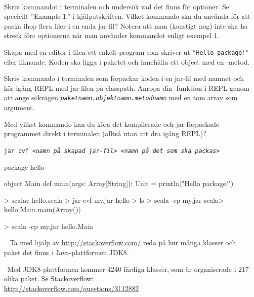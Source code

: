 
\QUESTBEGIN

\Task\Uberkurs  \what~

\Subtask Skriv kommandot  i terminalen och undersök vad det finns för optioner. Se speciellt ''Example 1.'' i hjälputskriften. Vilket kommando ska du använda för att packa ihop flera filer i en enda jar-fil? Notera att man (konstigt nog) inte ska ha streck före optionerna när man använder kommandot  enligt exempel 1.

\Subtask Skapa med en editor i filen  ett enkelt program som skriver ut \texttt{"Hello package!"} eller liknande. Koden ska ligga i paketet  och innehålla ett object  med en -metod.

\Subtask Skriv kommando i terminalen som förpackar koden i en jar-fil med namnet  och kör igång REPL med jar-filen på classpath. Anropa din -funktion i REPL genom att ange sökvägen \textit{\texttt{paketnamn.objektnamn.metodnamn}} med en tom array som argument.

\Subtask Med vilket kommando kan du köra det kompilerade och jar-förpackade programmet direkt i terminalen (alltså utan att dra igång REPL)?

\SOLUTION

\TaskSolved \what

\SubtaskSolved

\texttt{jar cvf \textit{<namn på skapad jar-fil> <namn på det som ska packas>}}

\SubtaskSolved
\begin{Code}
package hello

object Main {
  def main(args: Array[String]): Unit = println("Hello package!")
}
\end{Code}

\SubtaskSolved
\begin{REPL}
> scalac hello.scala
> jar cvf my.jar hello
> ls
> scala -cp my.jar
scala> hello.Main.main(Array())
\end{REPL}

\SubtaskSolved
\begin{REPL}
> scala -cp my.jar hello.Main
\end{REPL}

\QUESTEND





\QUESTBEGIN

\Task\Uberkurs \what~ Ta med hjälp av \url{http://stackoverflow.com/} reda på hur många klasser och paket det finns i Java-plattformen JDK8.

\SOLUTION

\TaskSolved \what~Med JDK8-plattformen kommer 4240 färdiga klasser, som är organiserade i 217 olika paket. Se Stackoverflow: \\\url{http://stackoverflow.com/questions/3112882}

\QUESTEND

